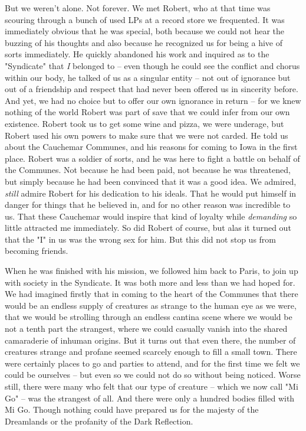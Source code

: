 But we weren't alone. Not forever. We met Robert, who at that time was scouring through a bunch of used LPs at a record store we frequented. It was immediately obvious that he was special, both because we could not hear the buzzing of his thoughts and also because he recognized us for being a hive of sorts immediately. He quickly abandoned his work and inquired as to the "Syndicate" that \textit{I} belonged to -- even though he could see the conflict and chorus within our body, he talked of us as a singular entity -- not out of ignorance but out of a friendship and respect that had never been offered us in sincerity before. And yet, we had no choice but to offer our own ignorance in return -- for we knew nothing of the world Robert was part of save that we could infer from our own existence. Robert took us to get some wine and pizza, we were underage, but Robert used his own powers to make sure that we were not carded. He told us about the Cauchemar Communes, and his reasons for coming to Iowa in the first place. Robert was a soldier of sorts, and he was here to fight a battle on behalf of the Communes. Not because he had been paid, not because he was threatened, but simply because he had been convinced that it was a good idea. We admired, \textit{still} admire Robert for his dedication to his ideals. That he would put himself in danger for things that he believed in, and for no other reason was incredible to us. That these Cauchemar would inspire that kind of loyalty while \textit{demanding} so little attracted me immediately. So did Robert of course, but alas it turned out that the "I" in us was the wrong sex for him. But this did not stop us from becoming friends.

When he was finished with his mission, we followed him back to Paris, to join up with society in the Syndicate. It was both more and less than we had hoped for. We had imagined firstly that in coming to the heart of the Communes that there would be an endless supply of creatures as strange to the human eye as we were, that we would be strolling through an endless cantina scene where we would be not a tenth part the strangest, where we could casually vanish into the shared camaraderie of inhuman origins. But it turns out that even there, the number of creatures strange and profane seemed scarcely enough to fill a small town. There were certainly places to go and parties to attend, and for the first time we felt we could be ourselves -- but even so we could not do so without being noticed. Worse still, there were many who felt that our type of creature -- which we now call "Mi Go" -- was the strangest of all. And there were only a hundred bodies filled with Mi Go. Though nothing could have prepared us for the majesty of the Dreamlands or the profanity of the Dark Reflection. 

